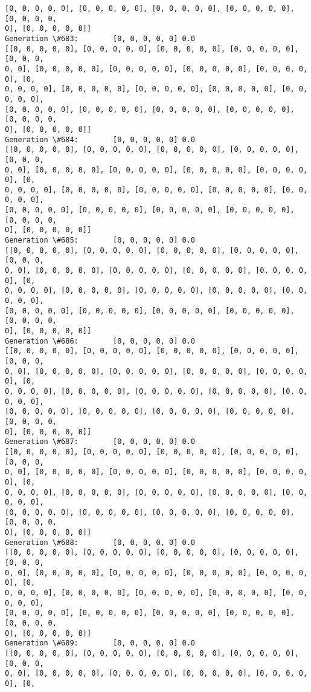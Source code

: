 \documentclass[11pt]{article}
\begin{document}
\begin{Verbatim}[commandchars=\\\{\}]
[0, 0, 0, 0, 0], [0, 0, 0, 0, 0], [0, 0, 0, 0, 0], [0, 0, 0, 0, 0], [0, 0, 0, 0,
0], [0, 0, 0, 0, 0]]
Generation \#683:        [0, 0, 0, 0, 0] 0.0
[[0, 0, 0, 0, 0], [0, 0, 0, 0, 0], [0, 0, 0, 0, 0], [0, 0, 0, 0, 0], [0, 0, 0,
0, 0], [0, 0, 0, 0, 0], [0, 0, 0, 0, 0], [0, 0, 0, 0, 0], [0, 0, 0, 0, 0], [0,
0, 0, 0, 0], [0, 0, 0, 0, 0], [0, 0, 0, 0, 0], [0, 0, 0, 0, 0], [0, 0, 0, 0, 0],
[0, 0, 0, 0, 0], [0, 0, 0, 0, 0], [0, 0, 0, 0, 0], [0, 0, 0, 0, 0], [0, 0, 0, 0,
0], [0, 0, 0, 0, 0]]
Generation \#684:        [0, 0, 0, 0, 0] 0.0
[[0, 0, 0, 0, 0], [0, 0, 0, 0, 0], [0, 0, 0, 0, 0], [0, 0, 0, 0, 0], [0, 0, 0,
0, 0], [0, 0, 0, 0, 0], [0, 0, 0, 0, 0], [0, 0, 0, 0, 0], [0, 0, 0, 0, 0], [0,
0, 0, 0, 0], [0, 0, 0, 0, 0], [0, 0, 0, 0, 0], [0, 0, 0, 0, 0], [0, 0, 0, 0, 0],
[0, 0, 0, 0, 0], [0, 0, 0, 0, 0], [0, 0, 0, 0, 0], [0, 0, 0, 0, 0], [0, 0, 0, 0,
0], [0, 0, 0, 0, 0]]
Generation \#685:        [0, 0, 0, 0, 0] 0.0
[[0, 0, 0, 0, 0], [0, 0, 0, 0, 0], [0, 0, 0, 0, 0], [0, 0, 0, 0, 0], [0, 0, 0,
0, 0], [0, 0, 0, 0, 0], [0, 0, 0, 0, 0], [0, 0, 0, 0, 0], [0, 0, 0, 0, 0], [0,
0, 0, 0, 0], [0, 0, 0, 0, 0], [0, 0, 0, 0, 0], [0, 0, 0, 0, 0], [0, 0, 0, 0, 0],
[0, 0, 0, 0, 0], [0, 0, 0, 0, 0], [0, 0, 0, 0, 0], [0, 0, 0, 0, 0], [0, 0, 0, 0,
0], [0, 0, 0, 0, 0]]
Generation \#686:        [0, 0, 0, 0, 0] 0.0
[[0, 0, 0, 0, 0], [0, 0, 0, 0, 0], [0, 0, 0, 0, 0], [0, 0, 0, 0, 0], [0, 0, 0,
0, 0], [0, 0, 0, 0, 0], [0, 0, 0, 0, 0], [0, 0, 0, 0, 0], [0, 0, 0, 0, 0], [0,
0, 0, 0, 0], [0, 0, 0, 0, 0], [0, 0, 0, 0, 0], [0, 0, 0, 0, 0], [0, 0, 0, 0, 0],
[0, 0, 0, 0, 0], [0, 0, 0, 0, 0], [0, 0, 0, 0, 0], [0, 0, 0, 0, 0], [0, 0, 0, 0,
0], [0, 0, 0, 0, 0]]
Generation \#687:        [0, 0, 0, 0, 0] 0.0
[[0, 0, 0, 0, 0], [0, 0, 0, 0, 0], [0, 0, 0, 0, 0], [0, 0, 0, 0, 0], [0, 0, 0,
0, 0], [0, 0, 0, 0, 0], [0, 0, 0, 0, 0], [0, 0, 0, 0, 0], [0, 0, 0, 0, 0], [0,
0, 0, 0, 0], [0, 0, 0, 0, 0], [0, 0, 0, 0, 0], [0, 0, 0, 0, 0], [0, 0, 0, 0, 0],
[0, 0, 0, 0, 0], [0, 0, 0, 0, 0], [0, 0, 0, 0, 0], [0, 0, 0, 0, 0], [0, 0, 0, 0,
0], [0, 0, 0, 0, 0]]
Generation \#688:        [0, 0, 0, 0, 0] 0.0
[[0, 0, 0, 0, 0], [0, 0, 0, 0, 0], [0, 0, 0, 0, 0], [0, 0, 0, 0, 0], [0, 0, 0,
0, 0], [0, 0, 0, 0, 0], [0, 0, 0, 0, 0], [0, 0, 0, 0, 0], [0, 0, 0, 0, 0], [0,
0, 0, 0, 0], [0, 0, 0, 0, 0], [0, 0, 0, 0, 0], [0, 0, 0, 0, 0], [0, 0, 0, 0, 0],
[0, 0, 0, 0, 0], [0, 0, 0, 0, 0], [0, 0, 0, 0, 0], [0, 0, 0, 0, 0], [0, 0, 0, 0,
0], [0, 0, 0, 0, 0]]
Generation \#689:        [0, 0, 0, 0, 0] 0.0
[[0, 0, 0, 0, 0], [0, 0, 0, 0, 0], [0, 0, 0, 0, 0], [0, 0, 0, 0, 0], [0, 0, 0,
0, 0], [0, 0, 0, 0, 0], [0, 0, 0, 0, 0], [0, 0, 0, 0, 0], [0, 0, 0, 0, 0], [0,

\end{Verbatim}
\end{document}
